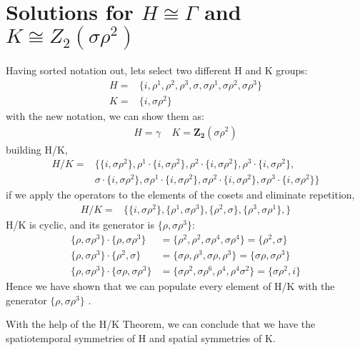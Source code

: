 \section{Solutions for $H \cong \Gamma$ and $K \cong Z_2(\sigma\rho^2)$}
Having sorted notation out, lets select two different H and K groups:
%
\begin{align}
H =& \{ i , \rho^1 ,\rho^2 ,\rho^3,  \sigma , \sigma\rho^1 ,\sigma\rho^2 ,\sigma\rho^3 \} \\
K =& \{ i , \sigma \rho^2 \}
\end{align}
%
with the new notation, we can show them as:
%
\begin{align}
H = \gamma  \;\;\;\; K=\mathbf{Z_2}(\sigma\rho^2)
\end{align}
%
building H/K,
%
\begin{align} 
H/K =& \{ \{ i , \sigma \rho^2 \} , \rho^1 \cdot\{ i , \sigma \rho^2 \} ,\rho^2 \cdot\{ i , \sigma \rho^2 \} ,\rho^3 \cdot\{ i , \sigma \rho^2 \},\\
 &\sigma \cdot\{ i , \sigma \rho^2 \} , \sigma\rho^1 \cdot\{ i , \sigma \rho^2 \} ,\sigma \rho^2 \cdot\{ i , \sigma \rho^2 \},\sigma\rho^3 \cdot\{ i , \sigma \rho^2 \} \} 
\end{align}
%
if we apply the operators to the elements of the cosets and eliminate repetition,
%
%
\begin{align} 
H/K = & \{ \{ i , \sigma\rho^2 \},\{ \rho^1 , \sigma \rho^3 \} ,\{ \rho^2  , \sigma \} , \{ \rho^3 , \sigma \rho^1 \}, \} 
\end{align}
H/K is cyclic, and its generator is $\{ \rho , \sigma \rho^3 \}$:
\begin{align} 
\{ \rho , \sigma \rho^3 \}\cdot\{ \rho , \sigma \rho^3 \} &= \{ \rho^2 ,\rho^2 , \sigma \rho^4 , \sigma \rho^4 \} = \{ \rho^2 ,\sigma\} \\
\{ \rho , \sigma \rho^3 \}\cdot \{ \rho^2 ,\sigma \} &= \{ \sigma\rho,\rho^3,\sigma\rho,\rho^3 \} =  \{\sigma \rho , \sigma \rho^3 \}\\
\{ \rho , \sigma \rho^3 \}\cdot \{\sigma \rho , \sigma \rho^3 \} &= \{\sigma \rho^2 , \sigma \rho^6, \rho^4, \rho^4\sigma^2 \} = \{ \sigma \rho^2 ,i \}
\end{align}
Hence we have shown that we can populate every element of H/K with the generator $\{ \rho , \sigma \rho^3 \}$ .

With the help of the H/K Theorem, we can conclude that we have the spatiotemporal symmetries of H and spatial symmetries of K.

